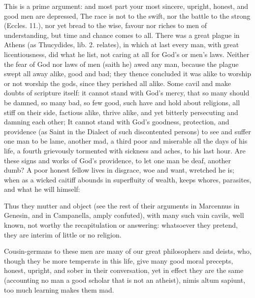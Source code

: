 {This is a prime argument: and most part your most sincere, upright,
honest, and good men are depressed, The race is not to the swift,
nor the battle to the strong (Eccles.  11.), nor yet bread to the
wise, favour nor riches to men of understanding, but time and chance
comes to all. There was a great plague in Athens (as Thucydides, lib.
2. relates), in which at last every man, with great licentiousness, did
what he list, not caring at all for God's or men's laws. Neither the
fear of God nor laws of men (saith he) awed any man, because the plague
swept all away alike, good and bad; they thence concluded it was alike
to worship or not worship the gods, since they perished all alike. Some
cavil and make doubts of scripture itself: it cannot stand with God's
mercy, that so many should be damned, so many bad, so few good, such
have and hold about religions, all stiff on their side, factious alike,
thrive alike, and yet bitterly persecuting and damning each other; It
cannot stand with God's goodness, protection, and providence (as
Saint \Chrysostom{} in the Dialect of such discontented persons) to
see and suffer one man to be lame, another mad, a third poor and
miserable all the days of his life, a fourth grievously tormented with
sickness and aches, to his last hour. Are these signs and works of
God's providence, to let one man be deaf, another dumb? A poor honest
fellow lives in disgrace, woe and want, wretched he is; when as a
wicked caitiff abounds in superfluity of wealth, keeps whores,
parasites, and what he will himself:


Thus they mutter and object (see the rest of their
arguments in Marcennus in Genesin, and in Campanella, amply confuted),
with many such vain cavils, well known, not worthy the recapitulation
or answering: whatsoever they pretend, they are interim of little or no
religion.

Cousin-germans to these men are many of our great philosophers and
deists, who, though they be more temperate in this life, give many good
moral precepts, honest, upright, and sober in their conversation, yet
in effect they are the same (accounting no man a good scholar that is
not an atheist), nimis altum sapiunt, too much learning makes them mad.

}
